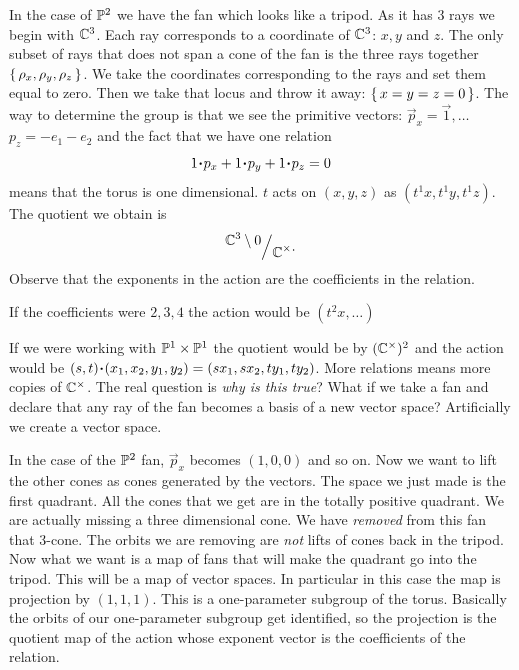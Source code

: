 \documentclass[12pt]{memoir}
\begin{document}
\begin{Ex}
    In the case of $\mathbb{P}^2$ we have the fan which looks like a tripod. As it has $3$ rays we begin with $\mathbb{C}^3$. Each ray corresponds to a coordinate of $\mathbb{C}^3$: $x,y$ and $z$. The only subset of rays that does not span a cone of the fan is the three rays together $\{\,\rho_x,\rho_y,\rho_z\,\}$. We take the coordinates corresponding to the rays and set them equal to zero. Then we take that locus and throw it away: $\{\,x=y=z=0\,\}$. The way to determine the group is that we see the primitive vectors: $\vec p_x=\vec 1,\dots$ $p_z=-e_1-e_2$ and the fact that we have one relation 
    $$1\.p_x+1\.p_y+1\.p_z=0$$
    means that the torus is one dimensional. $t$ acts on $(x,y,z)$ as $(t^1x,t^1y,t^1z)$. The quotient we obtain is 
    $$\quot{\bC^3\less 0}{\bC^\x}.$$
    Observe that the exponents in the action are the coefficients in the relation.
\end{Ex}

\begin{significant}
If the coefficients were $2,3,4$ the action would be $(t^2x,\dots)$
\end{significant}

If we were working with $\mathbb{P}^1\times\mathbb{P}^1$ the quotient would be by $(\mathbb{C}^\times)^2$ and the action would be $(s,t)\.(x_1,x_2,y_1,y_2)=(sx_1,sx_2,ty_1,ty_2)$. More relations means more copies of $\mathbb{C}^\times$. The real question is \emph{why is this true}? What if we take a fan and declare that any ray of the fan becomes a basis of a new vector space? Artificially we create a vector space.

\begin{Ex}
    In the case of the $\mathbb{P}^2$ fan, $\vec p_x$ becomes $(1,0,0)$ and so on. Now we want to lift the other cones as cones generated by the vectors. The space we just made is the first quadrant. All the cones that we get are in the totally positive quadrant. We are actually missing a three dimensional cone. We have \emph{removed} from this fan that 3-cone. The orbits we are removing are \emph{not} lifts of cones back in the tripod. Now what we want is a map of fans that will make the quadrant go into the tripod. This will be a map of vector spaces. In particular in this case the map is projection by $(1,1,1)$. This is a one-parameter subgroup of the torus. Basically the orbits of our one-parameter subgroup get identified, so the projection is the quotient map of the action whose exponent vector is the coefficients of the relation.
\end{Ex}
\end{document}
